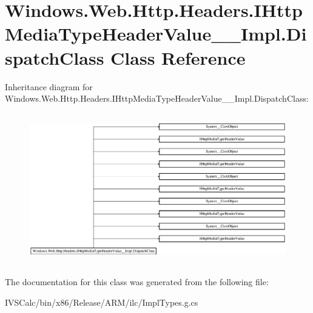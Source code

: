 \hypertarget{class_windows_1_1_web_1_1_http_1_1_headers_1_1_i_http_media_type_header_value_____impl_1_1_dispatch_class}{}\section{Windows.\+Web.\+Http.\+Headers.\+I\+Http\+Media\+Type\+Header\+Value\+\_\+\+\_\+\+Impl.\+Dispatch\+Class Class Reference}
\label{class_windows_1_1_web_1_1_http_1_1_headers_1_1_i_http_media_type_header_value_____impl_1_1_dispatch_class}
Inheritance diagram for Windows.\+Web.\+Http.\+Headers.\+I\+Http\+Media\+Type\+Header\+Value\+\_\+\+\_\+\+Impl.\+Dispatch\+Class\+:\begin{figure}[H]
\begin{center}
\leavevmode
\includegraphics[height=6.637931cm]{class_windows_1_1_web_1_1_http_1_1_headers_1_1_i_http_media_type_header_value_____impl_1_1_dispatch_class}
\end{center}
\end{figure}


The documentation for this class was generated from the following file\+:\begin{DoxyCompactItemize}
\item 
I\+V\+S\+Calc/bin/x86/\+Release/\+A\+R\+M/ilc/Impl\+Types.\+g.\+cs\end{DoxyCompactItemize}
